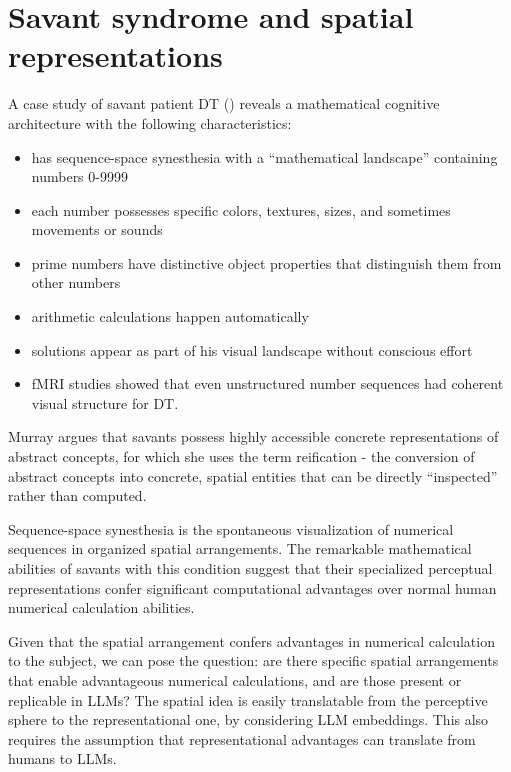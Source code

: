 \documentclass[
  a4paper, twoside, 10pt, titlepage]{book}
\providecommand{\tightlist}{%
  \setlength{\itemsep}{0pt}\setlength{\parskip}{0pt}}
\begin{document}
\section{Savant syndrome and spatial
representations}\label{savant-syndrome-and-spatial-representations}

A case study of savant patient DT () reveals a mathematical cognitive architecture with the following
characteristics:

\begin{itemize}
\tightlist
\item
  has sequence-space synesthesia with a ``mathematical landscape''
  containing numbers 0-9999
\item
  each number possesses specific colors, textures, sizes, and sometimes
  movements or sounds
\item
  prime numbers have distinctive object properties that distinguish them
  from other numbers
\item
  arithmetic calculations happen automatically
\item
  solutions appear as part of his visual landscape without conscious
  effort
\item
  fMRI studies showed that even unstructured number sequences had
  coherent visual structure for DT.
\end{itemize}

Murray argues that savants possess highly accessible concrete
representations of abstract concepts, for which she uses the term
reification - the conversion of abstract concepts into concrete, spatial
entities that can be directly ``inspected'' rather than computed.

Sequence-space synesthesia is the spontaneous visualization of numerical
sequences in organized spatial arrangements. The remarkable mathematical
abilities of savants with this condition suggest that their specialized
perceptual representations confer significant computational advantages
over normal human numerical calculation abilities.

Given that the spatial arrangement confers advantages in numerical
calculation to the subject, we can pose the question: are there specific
spatial arrangements that enable advantageous numerical calculations,
and are those present or replicable in LLMs? The spatial idea is easily
translatable from the perceptive sphere to the representational one, by
considering LLM embeddings. This also requires the assumption that
representational advantages can translate from humans to LLMs.
\end{document}
